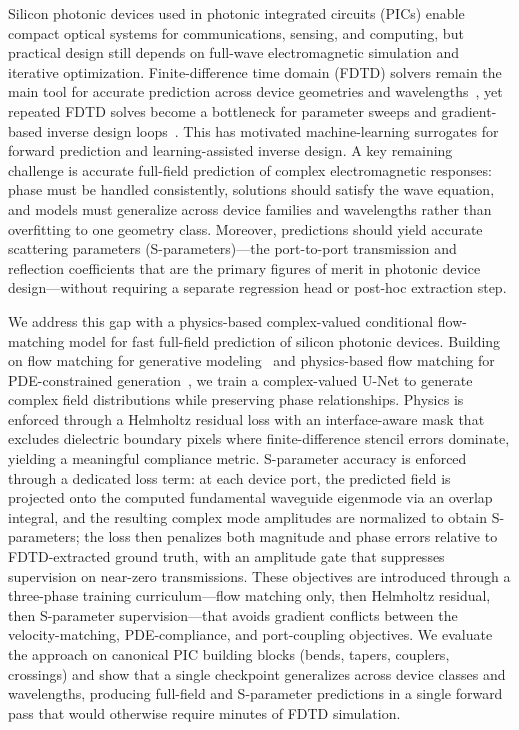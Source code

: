 Silicon photonic devices used in photonic integrated circuits (PICs) enable compact optical systems for
communications, sensing, and computing, but practical design still depends on full-wave electromagnetic simulation and
iterative optimization. Finite-difference time domain (FDTD) solvers remain the main tool for accurate prediction
across device geometries and wavelengths~\cite{TafloveHagness2005FDTD, Teixeira2023FDTDMethods, Oskooi2010Meep}, yet
repeated FDTD solves become a bottleneck for parameter sweeps and gradient-based inverse design
loops~\cite{Molesky2018InverseDesign}. This has motivated
machine-learning surrogates for forward prediction and learning-assisted inverse design. A key remaining challenge is
accurate full-field prediction of complex electromagnetic responses: phase must be handled consistently, solutions
should satisfy the wave equation, and models must generalize across device families and wavelengths rather than
overfitting to one geometry class. Moreover, predictions should yield accurate scattering parameters
(S-parameters)---the port-to-port transmission and reflection coefficients that are the primary figures of merit in
photonic device design---without requiring a separate regression head or post-hoc extraction step.

We address this gap with a physics-based complex-valued conditional flow-matching model for fast full-field prediction
of silicon photonic devices. Building on flow matching for generative modeling~\citep{Lipman2022FlowMatching} and
physics-based flow matching for PDE-constrained generation~\citep{Baldan2025PBFM}, we train a complex-valued U-Net to
generate complex field distributions while preserving phase relationships. Physics is enforced through a Helmholtz
residual loss with an interface-aware mask that excludes dielectric boundary pixels where finite-difference stencil
errors dominate, yielding a meaningful compliance metric. S-parameter accuracy is enforced through a dedicated loss
term: at each device port, the predicted field is projected onto the computed fundamental waveguide eigenmode via an
overlap integral, and the resulting complex mode amplitudes are normalized to obtain S-parameters; the loss then
penalizes both magnitude and phase errors relative to FDTD-extracted ground truth, with an amplitude gate that
suppresses supervision on near-zero transmissions. These objectives are introduced through a three-phase training
curriculum---flow matching only, then Helmholtz residual, then S-parameter supervision---that avoids gradient conflicts
between the velocity-matching, PDE-compliance, and port-coupling objectives. We evaluate the approach on canonical PIC
building blocks (bends, tapers, couplers, crossings) and show that a single checkpoint generalizes across device
classes and wavelengths, producing full-field and S-parameter predictions in a single forward pass that would otherwise
require minutes of FDTD simulation.

